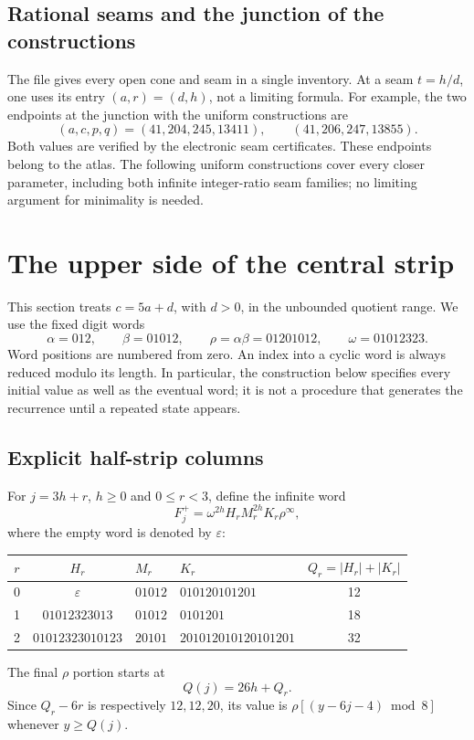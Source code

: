 \documentclass[11pt]{article}
\theoremstyle{remark}\newtheorem{remark}[theorem]{Remark}
\begin{document}
\subsection{Rational seams and the junction of the constructions}
The file  gives every open cone and seam in a single inventory. At a seam $t=h/d$, one uses its entry $(a,r)=(d,h)$, not a limiting formula. For example, the two endpoints at the junction with the uniform constructions are
\[
(a,c,p,q)=(41,204,245,13411),\qquad(41,206,247,13855).
\]
Both values are verified by the electronic seam certificates. These endpoints belong to the atlas. The following uniform constructions cover every closer parameter, including both infinite integer-ratio seam families; no limiting argument for minimality is needed.


\section{The upper side of the central strip}\label{sec:upper-central}\label{sec:upper-uniform}

This section treats $c=5a+d$, with $d>0$, in the unbounded
quotient range.  We use the fixed digit words
\[
 \alpha=012,\qquad \beta=01012,\qquad
 \rho=\alpha\beta=01201012,\qquad \omega=01012323.
\]
Word positions are numbered from zero.  An index into a cyclic word is
always reduced modulo its length.  In particular, the construction below
specifies every initial value as well as the eventual word; it is not a
procedure that generates the recurrence until a repeated state appears.

\subsection{Explicit half-strip columns}

For $j=3h+r$, $h\ge0$ and $0\le r<3$, define the infinite word
\begin{equation}\label{eq:upper-front}
 F_j^+=\omega^{2h}H_rM_r^{2h}K_r\rho^\infty,
\end{equation}
where the empty word is denoted by $\varepsilon$:
\begin{center}\small
\begin{tabular}{ccllc}\toprule
$r$&$H_r$&$M_r$&$K_r$&$Q_r=|H_r|+|K_r|$\\\midrule
0&$\varepsilon$&$01012$&$010120101201$&12\\
1&$01012323013$&$01012$&$0101201$&18\\
2&$01012323010123$&$20101$&$201012010120101201$&32\\\bottomrule
\end{tabular}
\end{center}
The final $\rho$ portion starts at
\begin{equation}\label{eq:upper-front-onset}
 Q(j)=26h+Q_r.
\end{equation}
Since $Q_r-6r$ is respectively $12,12,20$, its value is
$\rho[(y-6j-4)\bmod8]$ whenever $y\ge Q(j)$.
\end{document}

